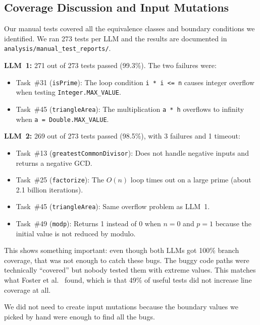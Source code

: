 \documentclass[12pt, a4paper]{article}
\begin{document}
\subsection{Coverage Discussion and Input Mutations}

Our manual tests covered all the equivalence classes and boundary conditions we identified. We ran 273 tests per LLM and the results are documented in \texttt{analysis/manual\_test\_reports/}.

\textbf{LLM~1:} 271 out of 273 tests passed (99.3\%). The two failures were:
\begin{itemize}
    \item Task~\#31 (\texttt{isPrime}): The loop condition \texttt{i * i <= n} causes integer overflow when testing \texttt{Integer.MAX\_VALUE}.
    \item Task~\#45 (\texttt{triangleArea}): The multiplication \texttt{a * h} overflows to infinity when \texttt{a = Double.MAX\_VALUE}.
\end{itemize}

\textbf{LLM~2:} 269 out of 273 tests passed (98.5\%), with 3 failures and 1 timeout:
\begin{itemize}
    \item Task~\#13 (\texttt{greatestCommonDivisor}): Does not handle negative inputs and returns a negative GCD.
    \item Task~\#25 (\texttt{factorize}): The $O(n)$ loop times out on a large prime (about 2.1 billion iterations).
    \item Task~\#45 (\texttt{triangleArea}): Same overflow problem as LLM~1.
    \item Task~\#49 (\texttt{modp}): Returns 1 instead of 0 when $n=0$ and $p=1$ because the initial value is not reduced by modulo.
\end{itemize}

This shows something important: even though both LLMs got 100\% branch coverage, that was not enough to catch these bugs. The buggy code paths were technically ``covered'' but nobody tested them with extreme values. This matches what Foster et al.~\cite{mutation_meta} found, which is that 49\% of useful tests did not increase line coverage at all.

We did not need to create input mutations because the boundary values we picked by hand were enough to find all the bugs.

\end{document}
